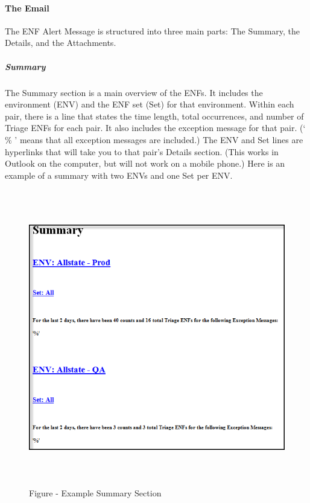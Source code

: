 \documentclass[a4paper,12pt]{report}
\begin{document}
\paragraph*{The Email}
 \par
The ENF Alert Message is structured into three main parts: The Summary, the Details, and the Attachments. \par
\subparagraph*{Summary}
 \par
The Summary section is a main overview of the ENFs. It includes the environment (ENV) and the ENF set (Set) for that environment. Within each pair, there is a line that states the time length, total occurrences, and number of Triage ENFs for each pair. It also includes the exception message for that pair. (‘ $  \%  $ ’ means that all exception messages are included.)  The ENV and Set lines are hyperlinks that will take you to that pair’s Details section. (This works in Outlook on the computer, but will not work on a mobile phone.) Here is an example of a summary with two ENVs and one Set per ENV. \par




\begin{figure}[H]
\begin{center}
\includegraphics[width=5.78in,height=5.08in]{./uploads_new/ENF_Alert_Emails.docx_DIR/media/image1.png}
\end{center}
\caption{Figure  - Example Summary Section}
\end{figure}
\end{document}
